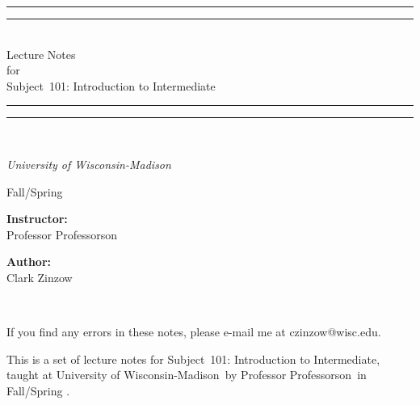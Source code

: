 \documentclass[twoside, titlepage]{amsart}
\makeatletter
\newcommand{\authorName}{Clark Zinzow}  %
\newcommand{\subject}{Subject}  %
\newcommand{\courseNumber}{101}  %
\newcommand{\courseName}{Introduction to Intermediate}  %
\newcommand{\instName}{Professor Professorson}  %
\newcommand{\semester}{Fall/Spring \the\year}  %
\newcommand{\universityName}{University of Wisconsin-Madison}  %
\newcommand{\authorEmail}{czinzow@wisc.edu}  %
\theoremstyle{plain} %
\theoremstyle{definition}
\theoremstyle{remark}
\theoremstyle{notation}
\makeatother
\begin{document}
	
	\begin{titlepage}
		\centering
		\vspace*{\baselineskip}
		\rule{\textwidth}{1.6pt}\vspace*{-\baselineskip}\vspace*{2pt}
		\rule{\textwidth}{0.4pt}\\[\baselineskip]
		\Huge Lecture Notes\\ for \\
			\subject\ \courseNumber: \courseName
		\\
		\rule{\textwidth}{0.4pt}\vspace*{-\baselineskip}\vspace*{3pt}
		\rule{\textwidth}{1.6pt}\\[\baselineskip]
		\vspace*{3\baselineskip}
		\huge {\itshape \universityName \par}
		\vspace*{\baselineskip}
		\semester \par
		\vspace*{3\baselineskip}
		\begin{minipage}{0.4\textwidth}
			\begin{flushleft}
				\begin{center}
					\huge \textbf{Instructor:}  \\[\baselineskip]
					{ \instName}	
				\end{center}		
			\end{flushleft}
		\end{minipage}
		\begin{minipage}{0.4\textwidth}
			\begin{flushright}
				\begin{center}
					\huge \textbf{Author:} \\[\baselineskip]
					{ \authorName}
				\end{center}
			\end{flushright}
		\end{minipage}\\
		\vfill
		{ If you find any errors in these notes, please e-mail me at \authorEmail. \par}
	\end{titlepage}
	
	This is a set of lecture notes for \subject\ \courseNumber: \courseName, taught at \universityName\ by \instName\ in \semester.
	\hspace{0pt} \\
	
\end{document}
